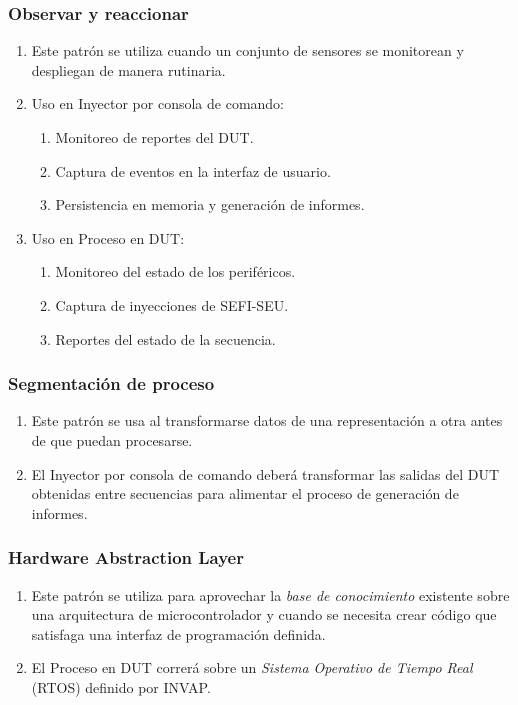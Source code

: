 \documentclass[
11pt, %
codirector, %
]{charter}
\begin{document}
\subsubsection{Observar y reaccionar}
\begin{enumerate}
	\item Este patrón se utiliza cuando un conjunto de sensores se monitorean y despliegan de manera rutinaria.
	\item Uso en Inyector por consola de comando:
		\begin{enumerate}
			\item Monitoreo de reportes del DUT.
			\item Captura de eventos en la interfaz de usuario.
			\item Persistencia en memoria y generación de informes.
		\end{enumerate}
	\item Uso en Proceso en DUT:
		\begin{enumerate}
			\item Monitoreo del estado de los periféricos.
			\item Captura de inyecciones de SEFI-SEU.
			\item Reportes del estado de la secuencia.
		\end{enumerate}
\end{enumerate}


\subsubsection{Segmentación de proceso}
\begin{enumerate}
	\item Este patrón se usa al transformarse datos de una representación a otra antes de que puedan procesarse.
	\item El Inyector por consola de comando deberá transformar las salidas del DUT obtenidas entre secuencias para alimentar el proceso de generación de informes.
\end{enumerate}

\subsubsection{Hardware Abstraction Layer}
\begin{enumerate}
	\item Este patrón se utiliza para aprovechar la \emph{base de conocimiento} existente sobre una arquitectura de microcontrolador y cuando se necesita crear código que satisfaga una interfaz de programación definida.
	\item El Proceso en DUT correrá sobre un \emph{Sistema Operativo de Tiempo Real} (RTOS) definido por INVAP.
\end{enumerate}
\end{document}
